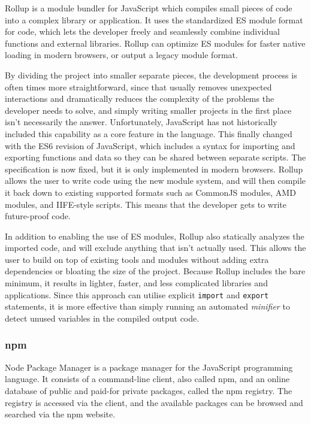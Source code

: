 \documentclass[english,engineering]{wizthesis}
\newcommand{\paraphrase}[1]{#1}
\begin{document}
\paraphrase{Rollup \cite{rollup} is a module bundler for JavaScript which
compiles small pieces of code into a complex library or application. It uses the
standardized ES module format for code, which lets the developer freely and
seamlessly combine individual functions and external libraries. Rollup can
optimize ES modules for faster native loading in modern browsers, or output a
legacy module format.

By dividing the project into smaller separate pieces, the development process is
often times more straightforward, since that usually removes unexpected
interactions and dramatically reduces the complexity of the problems the
developer needs to solve, and simply writing smaller projects in the first place
isn't necessarily the answer. Unfortunately, JavaScript has not historically
included this capability as a core feature in the language. This finally changed
with the ES6 revision of JavaScript, which includes a syntax for importing and
exporting functions and data so they can be shared between separate scripts. The
specification is now fixed, but it is only implemented in modern browsers.
Rollup allows the user to write code using the new module system, and will then
compile it back down to existing supported formats such as CommonJS modules, AMD
modules, and IIFE-style scripts. This means that the developer gets to write
future-proof code.

In addition to enabling the use of ES modules, Rollup also statically analyzes
the imported code, and will exclude anything that isn't actually used. This
allows the user to build on top of existing tools and modules without adding
extra dependencies or bloating the size of the project. Because Rollup includes
the bare minimum, it results in lighter, faster, and less complicated libraries
and applications. Since this approach can utilise explicit \texttt{import} and
\texttt{export} statements, it is more effective than simply running an
automated \emph{minifier} to detect unused variables in the compiled output
code.}

\subsubsection*{npm}

\paraphrase{Node Package Manager is a package manager for the JavaScript
programming language. It consists of a command-line client, also called npm, and
an online database of public and paid-for private packages, called the npm
registry. The registry is accessed via the client, and the available packages
can be browsed and searched via the npm website.}
\end{document}
